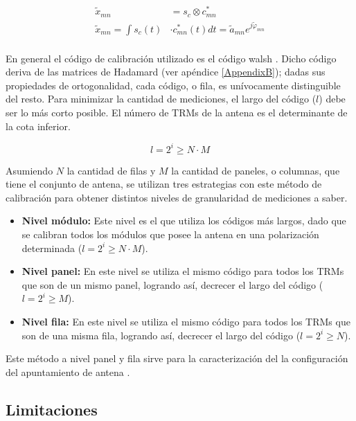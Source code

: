 \begin{equation}
\begin{aligned}
	\tilde{x}_{mn} &= s_c \otimes c^*_{mn} \\
	\tilde{x}_{mn} = \int s_c(t) &\cdot c^*_{mn}(t) dt = \tilde{a}_{mn}e^{j\tilde{\varphi}_{mn}} \\
\end{aligned}
\label{eq:classic_correlation}
\end{equation}

En general el código de calibración utilizado es el código walsh \cite{Singhal2012}. Dicho código deriva de las matrices de 
Hadamard (ver apéndice \ref{AppendixB}); dadas sus propiedades de ortogonalidad, cada código, o fila, es unívocamente 
distinguible del resto. Para minimizar la cantidad de mediciones, el largo del código ($l$) debe ser lo más corto posible. 
El número de TRMs de la antena es el determinante de la cota inferior.

\begin{equation}
	l = 2^i \ge N \cdot M
\end{equation}

Asumiendo $N$ la cantidad de filas y $M$ la cantidad de paneles, o columnas, que tiene el conjunto de antena, se utilizan tres
estrategias con este método de calibración para obtener distintos niveles de granularidad de mediciones a saber.

\begin{itemize}
	\item \textbf{Nivel módulo:} Este nivel es el que utiliza los códigos más largos, dado que se calibran todos los módulos que
		posee la antena en una polarización determinada ($l = 2^i \ge N \cdot M$).
	\item \textbf{Nivel panel:} En este nivel se utiliza el mismo código para todos los TRMs que son de un mismo panel,
		logrando así, decrecer el largo del código ($l = 2^i \ge M$).
	\item \textbf{Nivel fila:} En este nivel se utiliza el mismo código para todos los TRMs que son de una misma fila,
		logrando así, decrecer el largo del código ($l = 2^i \ge N$).
\end{itemize}

Este método a nivel panel y fila sirve para la caracterización del la configuración del apuntamiento de antena \cite{Br2007}.


\subsection{Limitaciones}

